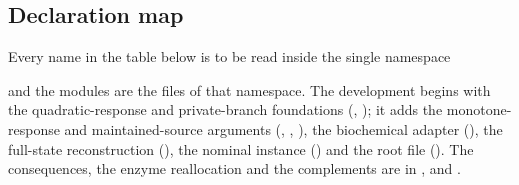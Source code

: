 \documentclass[11pt,a4paper]{article}
\theoremstyle{plain}
\theoremstyle{definition}
\theoremstyle{remark}
\begin{document}
\subsection{Declaration map}

Every name in the table below is to be read inside the single namespace
\begin{center}
\end{center}
and the modules are the files of that namespace. The development begins with the
quadratic-response and private-branch foundations (,
); it adds the monotone-response and maintained-source
arguments (, ,
), the biochemical adapter (), the
full-state reconstruction (), the nominal instance
() and the root file (). The consequences,
the enzyme reallocation and the complements are in ,
 and .
\end{document}
